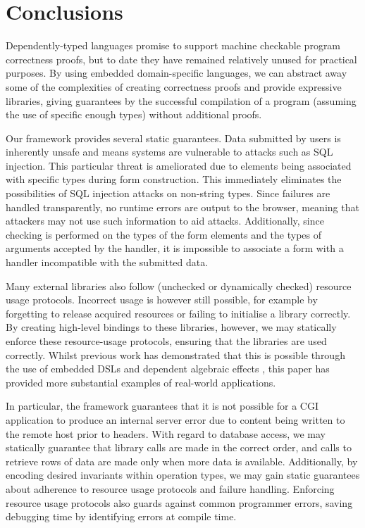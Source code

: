 
\section{Conclusions}

Dependently-typed languages promise to support machine checkable program
correctness proofs, but to date they have remained relatively unused for
practical purposes. By using embedded domain-specific languages, we can
abstract away some of the complexities of creating correctness proofs and
provide expressive libraries, giving guarantees by the successful compilation
of a program (assuming the use of specific enough types) without additional
proofs.

Our framework provides several static
guarantees. Data submitted by users is inherently unsafe and
means systems are vulnerable to attacks
such as SQL injection. This particular threat is ameliorated due
to elements being associated with specific types during form construction. This
immediately eliminates the possibilities of SQL injection attacks on non-string
types. Since failures are handled transparently, no runtime errors are output
to the browser, meaning that attackers may not use such information to aid
attacks. Additionally, since checking is performed on the types of the form
elements and the types of arguments accepted by the handler, it is impossible
to associate a form with a handler incompatible with the submitted data.

Many external libraries also follow (unchecked or dynamically checked) 
resource usage protocols.
Incorrect usage is however still possible, for
example by forgetting to release acquired resources or failing to
initialise a library correctly. By creating high-level bindings to these
libraries, however, we may statically enforce these resource-usage protocols,
ensuring that the libraries are used correctly. Whilst previous work has
demonstrated that this is possible through the use of embedded DSLs
\cite{brady:edsl} and dependent algebraic effects \cite{brady:effects},
this paper has provided more substantial examples of real-world applications. 

In particular, the framework guarantees that it is not possible for a CGI 
application to
produce an internal server error due to content being written to the remote
host prior to headers. With regard to database access, we may statically
guarantee that library calls are made in the correct order, and calls to
retrieve rows of data are made only when more data is available. Additionally, by encoding desired invariants within operation types, we may gain static guarantees about adherence to resource usage protocols and failure handling.
Enforcing resource usage protocols also guards against common programmer
errors, saving debugging time by identifying errors at compile time.

